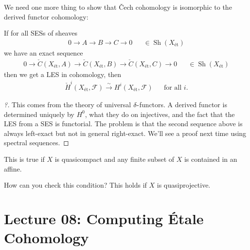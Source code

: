 We need one more thing to show that Čech cohomology is isomorphic to the
derived functor cohomology:

\begin{theorem}[?]

If for all SESs of sheaves
\begin{align*}  
0 \to A \to B \to C\to 0 && \in {\operatorname{Sh}}(X_\text{ét})
\end{align*}
we have an exact sequence
\begin{align*}  
0 \to \check{C}(X_\text{ét}, A) \to \check{C}(X_\text{ét}, B) \to \check{C}(X_\text{ét},C) \to 0 && \in {\operatorname{Sh}}(X_\text{ét})
\end{align*}
then we get a LES in cohomology, then
\begin{align*}  
{\check{H}}^{i}(X_\text{ét}, \mathcal{F}) \xrightarrow{\sim} H^i(X_\text{ét}, \mathcal{F}) && \text{for all }i
.\end{align*}

\end{theorem}

\begin{proof}[?]

This comes from the theory of universal \(\delta{\hbox{-}}\)functors. A
derived functor is determined uniquely by \(H^0\), what they do on
injectives, and the fact that the LES from a SES is functorial. The
problem is that the second sequence above is always left-exact but not
in general right-exact. We'll see a proof next time using spectral
sequences.

\end{proof}

\begin{theorem}

This is true if \(X\) is quasicompact and any finite subset of \(X\) is
contained in an affine.

\end{theorem}

\begin{remark}

How can you check this condition? This holds if \(X\) is
quasiprojective.

\end{remark}

\hypertarget{lecture-08-computing-uxe9tale-cohomology}{%
\section{Lecture 08: Computing Étale
Cohomology}\label{lecture-08-computing-uxe9tale-cohomology}}

